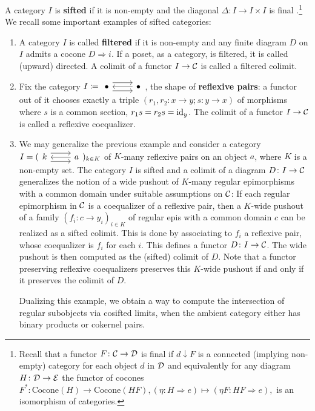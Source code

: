 A category $I$ is \textbf{sifted} if it is non-empty and the diagonal $\Delta\colon I\to I\times I$ is final \cite{AdamekRosickyVitale2010SiftedColimits, Adamek-Rosicky-Vitale}.\footnote{Recall that a functor $F\colon \mathcal{C}\to \mathcal{D}$ is final if $d\downarrow F$ is a connected (implying non-empty) category for each object $d$ in $\mathcal{D}$ and equivalently for any diagram $H\colon \mathcal{D}\to \mathcal{E}$ the functor of cocones $F^*\colon \mathrm{Cocone}(H)\to \mathrm{Cocone}(HF), (\eta\colon H\Rightarrow e)\mapsto (\eta F\colon HF\Rightarrow e),$ is an isomorphism of categories.} We recall some important examples of sifted categories:
\begin{enumerate}
    \item A category $I$ is called \textbf{filtered} if it is non-empty and any finite diagram $D$ on $I$ admits a cocone $D\Rightarrow i$. If a poset, as a category, is filtered, it is called (upward) directed. A colimit of a functor $I\to \mathcal{C}$ is called a filtered colimit.
    \item Fix the category $I \coloneqq \begin{tikzcd}
\bullet \arrow[r, shift left=2] \arrow[r, shift right=2] & \bullet \arrow[l]
\end{tikzcd}$, the shape of \textbf{reflexive pairs}: a functor out of it chooses exactly a triple $(r_1,r_2\colon x\to y; s\colon y\to x)$ of morphisms where $s$ is a common section, $r_1 s = r_2s = \mathrm{id}_y$. The colimit of a functor $I\to \mathcal{C}$ is called a reflexive coequalizer.
    \item We may generalize the previous example and consider a category $I = (\begin{tikzcd}
k \arrow[r, shift left=2] \arrow[r, shift right=2] & a \arrow[l]
\end{tikzcd})_{k\in K}$ of $K$-many reflexive pairs on an object $a$, where $K$ is a non-empty set. The category $I$ is sifted and a colimit of a diagram $D\colon I\to \mathcal{C}$ generalizes the notion of a wide pushout of $K$-many regular epimorphisms with a common domain under suitable assumptions on $\mathcal{C}$: If each regular epimorphism in $\mathcal{C}$ is a coequalizer of a reflexive pair, then a $K$-wide pushout of a family $(f_i\colon c\to y_i)_{i\in K}$ of regular epis with a common domain $c$ can be realized as a sifted colimit. This is done by associating to $f_i$ a reflexive pair, whose coequalizer is $f_i$ for each $i$. This defines a functor $D\colon I\to \mathcal{C}$. The wide pushout is then computed as the (sifted) colimit of $D$. Note that a functor preserving reflexive coequalizers preserves this $K$-wide pushout if and only if it preserves the colimit of $D$.

Dualizing this example, we obtain a way to compute the intersection of regular subobjects via cosifted limits, when the ambient category either has binary products or cokernel pairs.
\end{enumerate}

